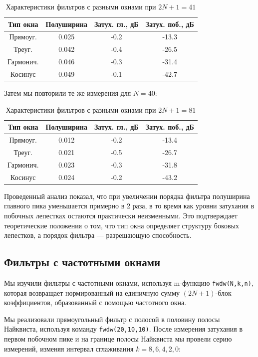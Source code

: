 \begin{longtable}[c]{|c|c|c|c|}
\caption{Характеристики фильтров с разными окнами при $2N+1=41$}
\label{tab:window_filters_41}\\
\hline
Тип окна & Полуширина & Затух. гл., дБ & Затух. поб., дБ \\ \hline
\endfirsthead
%
\endhead
%
Прямоуг. & 0.025 & -0.2 & -13.3 \\ \hline
Треуг. & 0.042 & -0.4 & -26.5 \\ \hline
Гармонич. & 0.046 & -0.3 & -31.4 \\ \hline
Косинус & 0.049 & -0.1 & -42.7 \\ \hline
\end{longtable}

Затем мы повторили те же измерения для $N = 40$:

\begin{longtable}[c]{|c|c|c|c|}
\caption{Характеристики фильтров с разными окнами при $2N+1=81$}
\label{tab:window_filters_81}\\
\hline
Тип окна & Полуширина & Затух. гл., дБ & Затух. поб., дБ \\ \hline
\endfirsthead
%
\endhead
%
Прямоуг. & 0.012 & -0.2 & -13.4 \\ \hline
Треуг. & 0.021 & -0.5 & -26.7 \\ \hline
Гармонич. & 0.023 & -0.3 & -31.8 \\ \hline
Косинус & 0.024 & -0.2 & -43.2 \\ \hline
\end{longtable}

Проведенный анализ показал, что при увеличении порядка фильтра полуширина главного пика уменьшается примерно в 2 раза, в то время как уровни затухания в побочных лепестках остаются практически неизменными. Это подтверждает теоретические положения о том, что тип окна определяет структуру боковых лепестков, а порядок фильтра — разрешающую способность.

\subsection{Фильтры с частотными окнами}
Мы изучили фильтры с частотными окнами, используя m-функцию \texttt{fwdw(N,k,n)}, которая возвращает нормированный на единичную сумму $(2N+1)$-блок коэффициентов, образованный с помощью частотного окна. 

Мы реализовали прямоугольный фильтр с полосой в половину полосы Найквиста, используя команду \texttt{fwdw(20,10,10)}. После измерения затухания в первом побочном пике и на границе полосы Найквиста мы провели серию измерений, изменяя интервал сглаживания $k = 8, 6, 4, 2, 0$:


